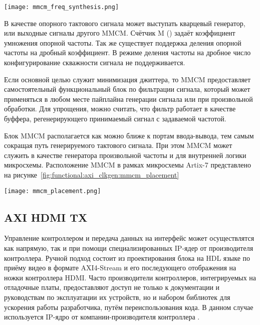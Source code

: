 \begin{center}
  \centering
  \texttt{[image: mmcm\_freq\_synthesis.png]}
  \label{fig:functional:axi_clkgen:mmcm_freq_synthesis}
\end{center}

В качестве опорного тактового сигнала может выступать кварцевый генератор, или выходные
сигналы другого MMCM. Счётчик M () задаёт коэффициент умножения опорной частоты.
Так же существует поддержка деления опорной частоты на дробный коэффициент. В режиме
деления частоты на дробное число конфигурирование скважности сигнала не поддерживается.

Если основной целью служит минимизация джиттера, то MMCM предоставляет самостоятельный
функциональный блок по фильтрации сигнала, который может применяться в любом месте
пайплайна генерации сигнала или при произвольной обработки. Для упрощения, можно считать, что
фильтр работает в качестве буффера, регенерирующего принимаемый сигнал с задаваемой частотой.

Блок  MMCM располагается как можно ближе к портам ввода-вывода, тем самым сокращая путь генерируемого тактового сигнала.
При этом MMCM может служить в качестве генератора произвольной частоты и для внутренней логики микросхемы.
Расположение MMCM в рамках микросхемы Artix-7 представлено на рисунке~\ref{fig:functional:axi_clkgen:mmcm_placement}

\begin{center}
  \centering
  \texttt{[image: mmcm\_placement.png]}
  \label{fig:functional:axi_clkgen:mmcm_placement}
\end{center}

\subsection{AXI HDMI TX}
\label{sec:functional:axi_hdmi_tx}

Управление контроллером  и передача данных на интерфейс может осуществлятся как напрямую,
так и при помощи специализированных IP-ядер от производителя контроллера. Ручной подход состоит из
проектирования блока на HDL языке по приёму видео в формате AXI4-Stream и его последующего отображения
на ножки контроллера HDMI. Часто производители контроллеров, интегрируемых на отладочные платы, предоставляют
доступ не только к документации и руководствам по эксплуатации их устройств, но и набором библиотек для
ускорения работы разработчика, путём переиспользования кода. В данном случае используется IP-ядро
от компании-производителя контроллера .

